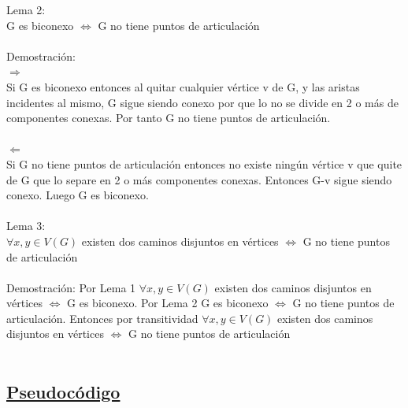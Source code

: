 \documentclass{article}
\begin{document}
    Lema 2:\\
    G es biconexo $\Longleftrightarrow$ G no tiene puntos de articulaci\'on \\\\
    Demostraci\'on:\\
    $\Longrightarrow$\\
    Si G es biconexo entonces al quitar cualquier v\'ertice v de G, y las aristas incidentes al mismo,  
    G sigue siendo conexo por que lo no se divide en 2 o m\'as de componentes conexas. Por tanto G no
    tiene puntos de articulaci\'on.\\\\
    $\Longleftarrow$\\
    Si G no tiene puntos de articulaci\'on entonces no existe ning\'un  v\'ertice v que quite de G que lo separe en
    2 o m\'as componentes conexas. Entonces G-v sigue siendo conexo. Luego G es biconexo.\\\\
  
    \newpage
    Lema 3:\\
    $\forall x,y\in V(G)$ existen dos caminos disjuntos en v\'ertices $\Longleftrightarrow$ G no tiene puntos de articulaci\'on\\\\
    Demostraci\'on:\newline
    Por Lema 1  $\forall x,y\in V(G)$ existen dos caminos disjuntos en v\'ertices $\Longleftrightarrow$ G es biconexo. 
    Por Lema 2 G es biconexo $\Longleftrightarrow$ G no tiene puntos de articulaci\'on.
    Entonces por transitividad $\forall x,y\in V(G)$ existen dos caminos disjuntos en v\'ertices 
    $\Longleftrightarrow$ G no tiene puntos de articulaci\'on\\\\
    
    \subsection{\underline{Pseudoc\'odigo}}
    
\end{document}
